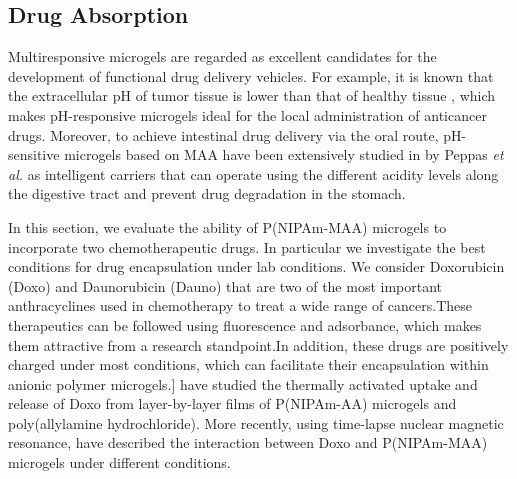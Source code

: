 \subsection{Drug Absorption}




Multiresponsive microgels are regarded as excellent candidates for the development of functional drug delivery vehicles.
For example, it is known that the extracellular pH of tumor tissue is lower than that of healthy tissue \addcite[Gerweck1996], which makes pH-responsive microgels
ideal for the local administration of anticancer drugs\addcite[Dadsetan2013].
Moreover, to achieve intestinal drug delivery via the oral route,
pH-sensitive microgels based on MAA have been extensively studied in by Peppas \emph{et al.} as intelligent carriers that can operate using the different acidity levels along the digestive tract and prevent drug degradation in the stomach.







In this section, we evaluate the ability of P(NIPAm-MAA) microgels to incorporate two chemotherapeutic drugs.
In particular we investigate the best conditions for drug encapsulation under lab conditions.
We consider Doxorubicin (Doxo) and Daunorubicin (Dauno) that are two of the most important anthracyclines used in chemotherapy to treat a wide range of cancers.
These therapeutics can be followed using fluorescence and adsorbance, which makes them attractive from a research standpoint. 
In addition, these drugs are positively charged under most conditions, which can facilitate their encapsulation within anionic polymer microgels.\addcite[Li2019]]
 have studied the thermally activated uptake and release of Doxo from layer-by-layer films of P(NIPAm-AA) microgels and poly(allylamine hydrochloride).
More recently, using time-lapse nuclear magnetic resonance,  have described the interaction between Doxo and P(NIPAm-MAA) microgels under different conditions.  



